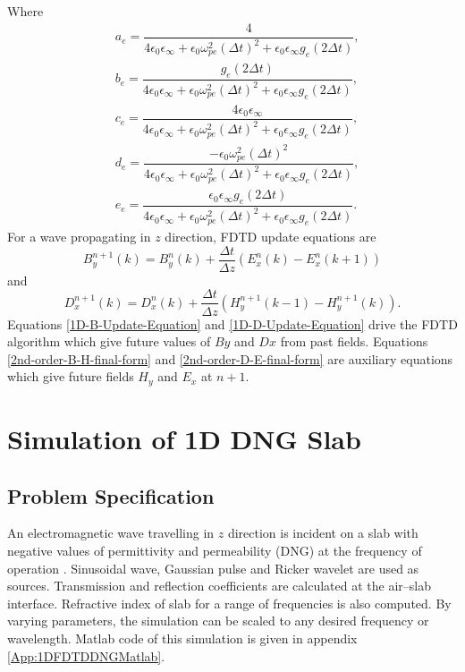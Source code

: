Where
\begin{eqnarray}
\nonumber & a_e=\dfrac{4}{4\epsilon_0\epsilon_\infty+\epsilon_0\omega^2_{pe}\left(\Delta t\right)^2+\epsilon_0\epsilon_\infty g_e \left(2\Delta t\right)},\\
\nonumber & b_e=\dfrac{g_e\left(2\Delta t\right)}{4\epsilon_0\epsilon_\infty+\epsilon_0\omega^2_{pe}\left(\Delta t\right)^2+\epsilon_0\epsilon_\infty g_e \left(2\Delta t\right)},\\
\nonumber & c_e=\dfrac{4\epsilon_0\epsilon_\infty}{4\epsilon_0\epsilon_\infty+\epsilon_0\omega^2_{pe}\left(\Delta t\right)^2+\epsilon_0\epsilon_\infty g_e \left(2\Delta t\right)},\\
\nonumber & d_e=\dfrac{-\epsilon_0\omega^2_{pe}\left(\Delta t\right)^2}{4\epsilon_0\epsilon_\infty+\epsilon_0\omega^2_{pe}\left(\Delta t\right)^2+\epsilon_0\epsilon_\infty g_e \left(2\Delta t\right)},\\
\nonumber & e_e=\dfrac{\epsilon_0\epsilon_\infty g_e\left(2\Delta t\right)}{4\epsilon_0\epsilon_\infty+\epsilon_0\omega^2_{pe}\left(\Delta t\right)^2+\epsilon_0\epsilon_\infty g_e \left(2\Delta t\right)}.
\label{1D-Drude-E-scalars}
\end{eqnarray}
For a wave propagating in $z$ direction, FDTD update equations are
\begin{equation}
B^{n+1}_y(k)=B^n_y(k)+\dfrac{\Delta t}{\Delta z}\left(E^n_x(k)-E^n_x(k+1)\right)
\label{1D-B-Update-Equation}
\end{equation}
and
\begin{equation}
D^{n+1}_x(k)=D^n_x(k)+\dfrac{\Delta t}{\Delta z}\left(H^{n+1}_y(k-1)-H^{n+1}_y(k)\right).
\label{1D-D-Update-Equation}
\end{equation}
Equations \ref{1D-B-Update-Equation} and \ref{1D-D-Update-Equation} drive the FDTD algorithm which give future values of $By$ and $Dx$ from past fields. Equations \ref{2nd-order-B-H-final-form} and \ref{2nd-order-D-E-final-form} are auxiliary equations which give future fields $H_y$ and $E_x$ at $n+1$.
\section{Simulation of 1D DNG Slab}
\subsection{Problem Specification}
An electromagnetic wave travelling in $z$ direction is incident on a slab with negative values of permittivity and permeability (DNG) at the frequency of operation \cite{DNG-Ehud-Ziol}. Sinusoidal wave, Gaussian pulse and Ricker wavelet are used as sources. Transmission and reflection coefficients are calculated at the air--slab interface. Refractive index of slab for a range of frequencies is also computed. By varying parameters, the simulation can be scaled to any desired frequency or wavelength. Matlab code of this simulation is given in appendix \ref{App:1DFDTDDNGMatlab}.

